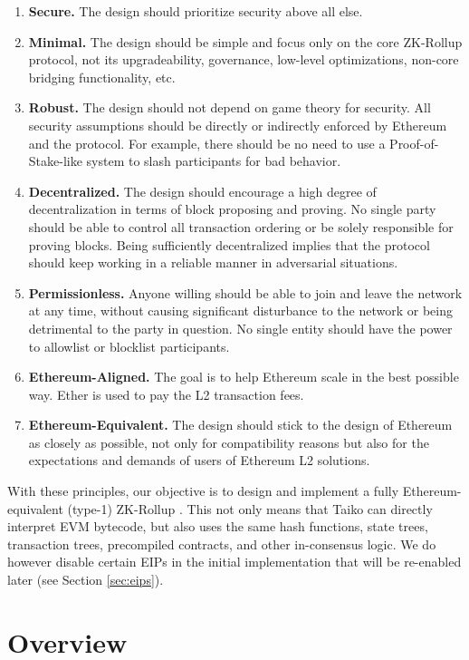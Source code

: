 \documentclass[9pt,oneside]{amsart}
\begin{document}
\begin{multicols}{2}
\begin{enumerate}
\item \textbf{Secure.} The design should prioritize security above all else.
\item \textbf{Minimal.} The design should be simple and focus only on the core ZK-Rollup protocol, not its upgradeability, governance, low-level optimizations, non-core bridging functionality, etc.
\item  \textbf{Robust.} The design should not depend on game theory for security. All security assumptions should be directly or indirectly enforced by Ethereum and the protocol. For example, there should be no need to use a Proof-of-Stake-like system to slash participants for bad behavior.
\item \textbf{Decentralized.} The design should encourage a high degree of decentralization in terms of block proposing and proving. No single party should be able to control all transaction ordering or be solely responsible for proving blocks. Being sufficiently decentralized implies that the protocol should keep working in a reliable manner in adversarial situations.
\item \textbf{Permissionless.} Anyone willing should be able to join and leave the network at any time, without causing significant disturbance to the network or being detrimental to the party in question. No single entity should have the power to allowlist or blocklist participants.
\item \textbf{Ethereum-Aligned.} The goal is to help Ethereum scale in the best possible way. Ether is used to pay the L2 transaction fees.
\item \textbf{Ethereum-Equivalent.} The design should stick to the design of Ethereum as closely as possible, not only for compatibility reasons but also for the expectations and demands of users of Ethereum L2 solutions.
\end{enumerate}

With these principles, our objective is to design and implement a fully Ethereum-equivalent (type-1) ZK-Rollup \cite{vitalik-zkevm}. This not only means that Taiko can directly interpret EVM bytecode, but also uses the same hash functions, state trees, transaction trees, precompiled contracts, and other in-consensus logic. We do however disable certain EIPs in the initial implementation\cite{taikoprotogithub} that will be re-enabled later (see Section \ref{sec:eips}).

\section{Overview}\label{sec:properties}


\end{multicols}
\end{document}
